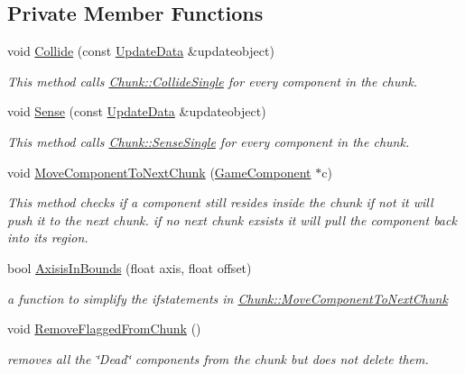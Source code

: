 \subsection*{Private Member Functions}
\begin{DoxyCompactItemize}
\item 
void \hyperlink{class_chunk_a48ee3a744acf3492cdf221037f0b7822}{Collide} (const \hyperlink{class_update_data}{Update\-Data} \&updateobject)
\begin{DoxyCompactList}\small\item\em This method calls \hyperlink{class_chunk_a41f009780aa4934be3f839a4518616ed}{Chunk\-::\-Collide\-Single} for every component in the chunk. \end{DoxyCompactList}\item 
void \hyperlink{class_chunk_a78f140c690751b838b0a7e09a51e6936}{Sense} (const \hyperlink{class_update_data}{Update\-Data} \&updateobject)
\begin{DoxyCompactList}\small\item\em This method calls \hyperlink{class_chunk_ab038489f8de577890226307499da10af}{Chunk\-::\-Sense\-Single} for every component in the chunk. \end{DoxyCompactList}\item 
void \hyperlink{class_chunk_a749ea52ccf2c2905408c35e43545b6e0}{Move\-Component\-To\-Next\-Chunk} (\hyperlink{class_game_component}{Game\-Component} $\ast$c)
\begin{DoxyCompactList}\small\item\em This method checks if a component still resides inside the chunk if not it will push it to the next chunk. if no next chunk exsists it will pull the component back into its region. \end{DoxyCompactList}\item 
bool \hyperlink{class_chunk_aae4f8da15c8d73f2c6da55642aa8ca72}{Axisis\-In\-Bounds} (float axis, float offset)
\begin{DoxyCompactList}\small\item\em a function to simplify the ifstatements in \hyperlink{class_chunk_a749ea52ccf2c2905408c35e43545b6e0}{Chunk\-::\-Move\-Component\-To\-Next\-Chunk} \end{DoxyCompactList}\item 
void \hyperlink{class_chunk_aa7f84e97b0fd555faeb811c747a6d26d}{Remove\-Flagged\-From\-Chunk} ()
\begin{DoxyCompactList}\small\item\em removes all the \char`\"{}\-Dead\char`\"{} components from the chunk but does not delete them. \end{DoxyCompactList}\end{DoxyCompactItemize}
